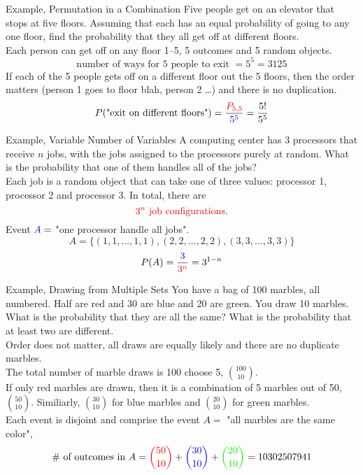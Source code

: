 \documentclass[handout]{beamer}
\newcommand{\blue}[1]{{\color{blue} #1}}
\newcommand{\red}[1]{{\color{red} #1}}
\newcommand{\grn}[1]{{\color{green} #1}}
\newcommand{\nl}[1]{\vspace{#1 em}}
\begin{document}
\begin{frame}{Example, Permutation in a Combination}
    Five people get on an elevator that stops at five floors. Assuming that each has an equal probability of going to any one floor, find the probability that they all get off at different floors.\\
    \nl{0.5}
    \pause Each person can get off on any floor 1--5, \blue{5 outcomes and 5 random objects}.
    \[\text{number of ways for 5 people to exit } = 5^5 = 3125\]
    \pause If each of the \red{5 people} gets off on a different floor out the \red{5 floors}, then the order matters (person 1 goes to floor blah, person 2 \ldots) and there is no duplication.
    \pause \[P(\text{"exit on different floors"}) = \frac{\red{P_{5,5}}}{\blue{5^5}} = \frac{5!}{5^5}\]
\end{frame}

\begin{frame}{Example, Variable Number of Variables}
    A computing center has 3 processors that receive $n$ jobs, with the jobs assigned to the processors purely at random. What is the probability that one of them handles all of the jobs?
    \pause\\
    \nl{0.5}
    Each job is a random object that can take one of three values: processor 1, processor 2 and processor 3. \pause In total, there are 
    \[\red{3^n \text{ job configurations}}.\]
    \pause Event $\blue{A} = $ "one processor handle all jobs".
    \pause \[A =\{ (1,1, \ldots,1,1), (2,2, \ldots,2,2), (3,3, \ldots,3,3) \}\]
    \pause \[P(A) =  \frac{\blue{3}}{\red{3^n}} = 3^{1-n}\]
\end{frame}

\begin{frame}{Example, Drawing from Multiple Sets}
    You have a bag of 100 marbles, all numbered. Half are red and 30 are blue and 20 are green. You draw 10 marbles. What is the probability that they are all the same? What is the probability that at least two are different.\\
    \nl{0.5}
    \pause Order does not matter, all draws are equally likely and there are no duplicate marbles.\\
    \nl{0.5}
    \pause The total number of marble draws is 100 choose 5, $\binom{100}{10}$.\\
    \nl{0.5}
    \pause If only red marbles are drawn, then it is a \red{combination of 5 marbles out of 50, $\binom{50}{10}$}. \pause Similiarly, \blue{$\binom{30}{10}$} for blue marbles and \grn{$\binom{20}{10}$} for green marbles.\\
    \nl{0.5}
    \pause Each event is disjoint and comprise the event $A=$ "all marbles are the same color",
    \pause \[\text{\# of outcomes in }A = \red{\binom{50}{10}} + \blue{\binom{30}{10}} + \grn{\binom{20}{10}} = 10302507941\]
\end{frame}
\end{document}
